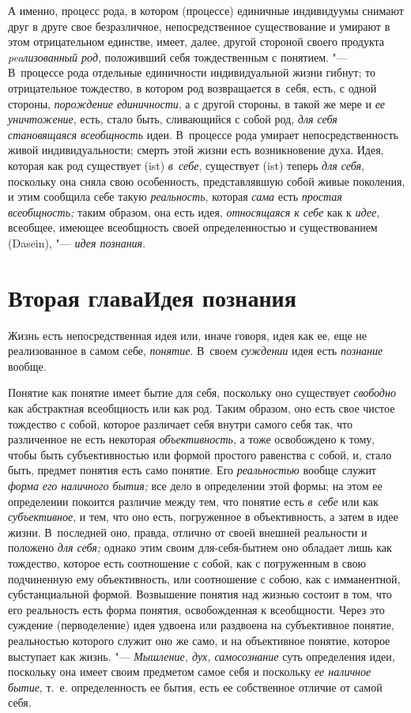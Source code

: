 А именно, процесс рода, в котором (процессе) единичные
индивидуумы снимают друг в друге свое безразличное, непосредственное
существование и умирают в этом отрицательном единстве, имеет, далее, другой
стороной своего продукта {\em peaлизованный род},
положивший себя тождественным с понятием. "--- В~процессе рода
отдельные единичности индивидуальной жизни гибнут; то
отрицательное тождество, в котором род возвращается в~себя, есть, с одной
стороны, {\em порождение единичности},
а с другой стороны, в такой же мере и {\em ее уничтожение},
есть, стало быть, сливающийся с собой род,
{\em для себя становящаяся всеобщность}
идеи. В~процессе рода умирает непосредственность живой
индивидуальности; смерть этой жизни есть возникновение духа. Идея, которая
как род существует (ist) {\em в~себе},
существует (ist) теперь {\em для себя}, поскольку
она сняла свою особенность, представлявшую собой живые поколения, и этим
сообщила себе такую {\em реальность}, которая {\em сама}
есть {\em простая всеобщность;} таким образом, она есть идея,
{\em относящаяся к себе} как к {\em идее},
всеобщее, имеющее всеобщность своей определенностью и
существованием (Dasein), "--- {\em идея познания}.

\chapter[Вторая глава Идея познания]{Вторая глава\newline Идея познания}

Жизнь есть непосредственная идея или, иначе говоря, идея как
ее, еще не реализованное в самом себе, {\em понятие}. В~своем
{\em суждении} идея есть {\em познание} вообще.

Понятие как понятие имеет бытие для себя, поскольку оно
существует {\em свободно}
как абстрактная всеобщность или как род. Таким образом, оно
есть свое чистое тождество с собой, которое различает себя внутри самого
себя так, что различенное не есть некоторая {\em объективность}, а
тоже освобождено к тому, чтобы быть субъективностью или формой простого
равенства с собой, и, стало быть, предмет понятия есть само понятие. Его
{\em реальностью} вообще служит {\em форма} {\em его наличного бытия;}
все дело в определении этой формы; на этом ее определении
покоится различие между тем, что понятие есть
{\em в~себе} или как {\em субъективное}, и
тем, что оно есть, погруженное в объективность, а затем в идее жизни.
В~последней оно, правда, отлично от своей внешней реальности и положено
{\em для себя;} однако
этим своим для-себя-бытием оно обладает лишь как тождество, которое есть
соотношение с собой, как с погруженным в свою подчиненную ему
объективность, или соотношение с собою, как с имманентной, субстанциальной
формой. Возвышение понятия над жизнью состоит в том, что его реальность
есть форма понятия, освобожденная к всеобщности. Через это суждение
(перводеление) идея удвоена или раздвоена на субъективное понятие,
реальностью которого служит оно же само, и на объективное понятие, которое
выступает как жизнь. "--- {\em Мышление,
дух, самосознание} суть определения идеи, поскольку она
имеет своим предметом самое себя и поскольку
{\em ее наличное бытие},
т.~е. определенность ее бытия, есть ее собственное отличие от
самой себя.

